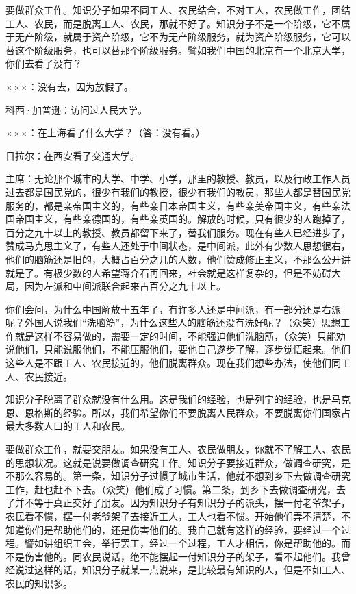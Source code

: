要做群众工作。知识分子如果不同工人、农民结合，不对工人，农民做工作，团结工人、农民，而是脱离工人、农民，那就不好了。知识分子不是一个阶级，它不属于无产阶级，就属于资产阶级，它不为无产阶级服务，就为资产阶级服务，它可以替这个阶级服务，也可以替那个阶级服务。譬如我们中国的北京有一个北京大学，你们去看了没有？

×××：没有去，因为放假了。

科西·加普逊：访问过人民大学。

×××：在上海看了什么大学？（答：没有看。）

日拉尔：在西安看了交通大学。

主席：无论那个城市的大学、中学、小学，那里的教授、教员，以及行政工作人员过去都是国民党的，很少有我们的教授，很少有我们的教员，那些人都是替国民党服务的，都是亲帝国主义的，有些亲日本帝国主义，有些亲美帝国主义，有些亲法国帝国主义，有些亲德国的，有些亲英国的。解放的时候，只有很少的人跑掉了，百分之九十以上的教授、教员都留下来了，替我们服务。现在有些人已经进步了，赞成马克思主义了，有些人还处于中间状态，是中间派，此外有少数人思想很右，他们的脑筋还是旧的，大概占百分之几的人数，他们赞成修正主义，不那么公开讲就是了。有极少数的人希望蒋介石再回来，社会就是这样复杂的，但是不妨碍大局，因为左派和中间派联合起来占百分之九十以上。

你们会问，为什么中国解放十五年了，有许多人还是中间派，有一部分还是右派呢？外国人说我们“洗脑筋”，为什么这些人的脑筋还没有洗好呢？（众笑）思想工作就是这样不容易做的，需要一定的时间，不能强迫他们洗脑筋，（众笑）只能劝说他们，只能说服他们，不能压服他们，要他自己遂步了解，逐步觉悟起来。他们这些人是不跟工人、农民接近的，他们脱离群众。现在我们想些办法，使他们同工人、农民接近。

知识分子脱离了群众就没有什么用。这是我们的经验，也是列宁的经验，也是马克恩、恩格斯的经验。所以，我们希望你们不要脱离人民群众，不要脱离你们国家占最大多数人口的工人和农民。

要做群众工作，就要交朋友。如果没有工人、农民做朋友，你就不了解工人、农民的思想状况。这就是说要做调查研究工作。知识分子要接近群众，做调查研究，是不那么容易的。第一条，知识分子过惯了城市生活，他就不想到乡下去做调查研究工作，赶也赶不下去。（众笑）他们成了习惯。第二条，到乡下去做调查研究，去了并不等于真正交好了朋友。因为知识分子有知识分子的派头，摆一付老爷架子，农民看不惯，摆一付老爷架子去接近工人，工人也看不惯。开始他们弄不清楚，不知道你们是帮助他们的，还是伤害他们的。我自己就有这样的经验，要经过一个过程。譬如讲组织工会，举行罢工，经过一个过程，工人才相信，你是帮助他的。而不是伤害他的。同农民说话，绝不能摆起一付知识分子的架子，看不起他们。我曾经说过这样的话，知识分子就某一点说来，是比较最有知识的人，但是不如工人、农民的知识多。

